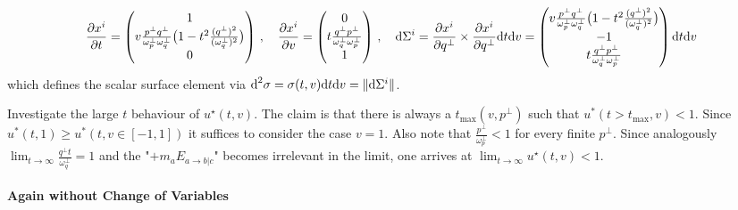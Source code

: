 \begin{equation}
    \frac{\partial x^i}{\partial t}=\begin{pmatrix}
    1\\
    v\frac{p^\perp q^\perp}{\omega_p^\perp\omega_q^\perp}\big(1-t^2\frac{(q^\perp)^2}{(\omega_q^\perp)^2}\big)\\
    0
    \end{pmatrix}\,,\quad
    \frac{\partial x^i}{\partial v}=\begin{pmatrix}
        0\\
        t\frac{q^\perp p^\perp}{\omega_q^\perp\omega_p^\perp}\\
        1
    \end{pmatrix}\,,\quad
    \text{d}\Sigma^i=\frac{\partial x^i}{\partial q^\perp}\times \frac{\partial x^i}{\partial q^\perp}\text{d} t\text{d} v=\begin{pmatrix}
        v\frac{p^\perp q^\perp}{\omega_p^\perp\omega_q^\perp}\big(1-t^2\frac{(q^\perp)^2}{(\omega_q^\perp)^2}\big)\\
        -1\\
        t\frac{q^\perp p^\perp}{\omega_q^\perp\omega_p^\perp}
    \end{pmatrix}\text{d} t\text{d} v
\end{equation}
which defines the scalar surface element via $\text{d}^2\sigma=\sigma(t,v)\text{d} t\text{d} v=\Vert\text{d}\Sigma^i\Vert$.

Investigate the large $t$ behaviour of $u^\star(t,v)$. The claim is that there is always a $t_{\text{max}}(v,p^\perp)$ such that $u^*(t>t_{\text{max}},v)<1$. Since $u^*(t,1)\geq u^*(t,v\in[-1,1])$ it suffices to consider the case $v=1$. Also note that $\frac{p^\perp}{\omega_p^\perp}<1$ for every finite $p^\perp$. Since analogously $\lim_{t\to\infty}\frac{q^\perp t}{\omega_q^\perp}=1$ and the "$+m_aE_{a\rightarrow b\vert c}$" becomes irrelevant in the limit, one arrives at $\lim_{t\to\infty}u^\star(t,v)<1$.


\paragraph*{Again without Change of Variables}\mbox{}\\

